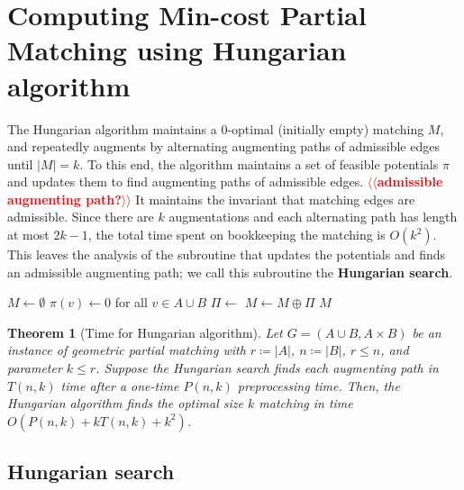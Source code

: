 \documentclass[11pt]{article}
\makeatletter
\theoremstyle{plain}
\newtheorem{theorem}[lemma]{Theorem}
\numberwithin{figure}{section}
\def\EMPH#1{\textbf{\boldmath #1}}
\def\n@te#1{\textsf{\boldmath \textbf{$\langle\!\langle$#1$\rangle\!\rangle$}}\leavevmode}
\def\note#1{\textcolor{red}{\n@te{#1}}}
\makeatother
\begin{document}
\section{Computing Min-cost Partial Matching using Hungarian algorithm}
\label{section:hung}

The Hungarian algorithm maintains a 0-optimal (initially empty) matching $M$,
and repeatedly augments by alternating augmenting paths of admissible edges
until $|M| = k$.
To this end, the algorithm maintains a set of feasible potentials $\pi$ and
updates them to find augmenting paths of admissible edges. \note{admissible augmenting path?}
It maintains the invariant that matching edges are admissible.
Since there are $k$ augmentations and each alternating path has length at most
$2k-1$, the total time spent on bookkeeping the matching is $O(k^2)$.
This leaves the analysis of the subroutine that updates the potentials and
finds an admissible augmenting path; we call this subroutine the
\EMPH{Hungarian search}.

\begin{figure*}
\centering
\begin{minipage}{.5\linewidth}
\begin{algorithm}[H]
\caption{Hungarian algorithm}
\begin{algorithmic}[1]
	\State $M \gets \emptyset$
	\State $\pi(v) \gets 0$ for all $v \in A \cup B$
		\State $\Pi \gets$ 
		\State $M \gets M \oplus \Pi$
	\EndWhile
	\State\Return $M$
\EndFunction
\end{algorithmic}
\end{algorithm}
\end{minipage}
\end{figure*}


\begin{theorem}[Time for Hungarian algorithm]
\label{theorem:hung_orig}
Let $G = (A \cup B, A \times B)$ be an instance of geometric partial matching
with $r \coloneqq |A|$, $n \coloneqq |B|$, $r \leq n$, and parameter $k \leq r$.
Suppose the Hungarian search finds each augmenting path in $T(n, k)$ time after
a one-time $P(n, k)$ preprocessing time.
Then, the Hungarian algorithm finds the optimal size $k$ matching in time
$O(P(n, k) + k T(n, k) + k^2)$.
\end{theorem}

\subsection{Hungarian search}
\end{document}
